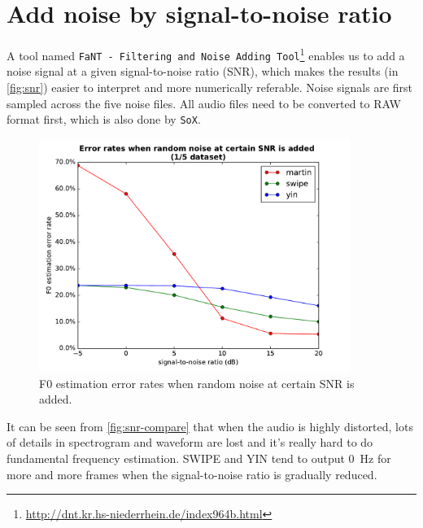\documentclass[11pt,a4paper]{report}
\begin{document}
\newpage

\section{Add noise by signal-to-noise ratio}

A tool named \texttt{FaNT - Filtering and Noise Adding Tool}\footnote{\url{http://dnt.kr.hs-niederrhein.de/index964b.html}} enables us to add a noise signal at a given signal-to-noise ratio (SNR), which makes the results (in \autoref{fig:snr}) easier to interpret and more numerically referable.
Noise signals are first sampled across the five noise files.
All audio files need to be converted to RAW format first, which is also done by \texttt{SoX}.

\begin{figure}[htbp]
  \centering
  \includegraphics[width=0.9\textwidth]{error_rates_vs_snrs.pdf}
  \caption{F0 estimation error rates when random noise at certain SNR is added.} \label{fig:snr}
\end{figure}

It can be seen from \autoref{fig:snr-compare} that when the audio is highly distorted, lots of details in spectrogram and waveform are lost and it's really hard to do fundamental frequency estimation.
SWIPE and YIN tend to output \SI{0}{\hertz} for more and more frames when the signal-to-noise ratio is gradually reduced.
\end{document}
